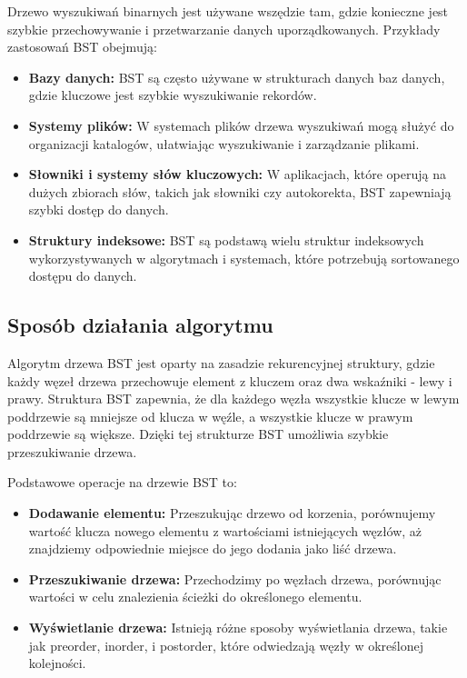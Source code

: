 Drzewo wyszukiwań binarnych jest używane wszędzie tam, gdzie konieczne jest szybkie przechowywanie i przetwarzanie danych uporządkowanych. Przykłady zastosowań BST obejmują:
\begin{itemize}
	\item \textbf{Bazy danych:} BST są często używane w strukturach danych baz danych, gdzie kluczowe jest szybkie wyszukiwanie rekordów.
	\item \textbf{Systemy plików:} W systemach plików drzewa wyszukiwań mogą służyć do organizacji katalogów, ułatwiając wyszukiwanie i zarządzanie plikami.
	\item \textbf{Słowniki i systemy słów kluczowych:} W aplikacjach, które operują na dużych zbiorach słów, takich jak słowniki czy autokorekta, BST zapewniają szybki dostęp do danych.
	\item \textbf{Struktury indeksowe:} BST są podstawą wielu struktur indeksowych wykorzystywanych w algorytmach i systemach, które potrzebują sortowanego dostępu do danych.
\end{itemize}

\subsection{Sposób działania algorytmu}

Algorytm drzewa BST jest oparty na zasadzie rekurencyjnej struktury, gdzie każdy węzeł drzewa przechowuje element z kluczem oraz dwa wskaźniki - lewy i prawy. Struktura BST zapewnia, że dla każdego węzła wszystkie klucze w lewym poddrzewie są mniejsze od klucza w węźle, a wszystkie klucze w prawym poddrzewie są większe. Dzięki tej strukturze BST umożliwia szybkie przeszukiwanie drzewa.

Podstawowe operacje na drzewie BST to:
\begin{itemize}
	\item \textbf{Dodawanie elementu:} Przeszukując drzewo od korzenia, porównujemy wartość klucza nowego elementu z wartościami istniejących węzłów, aż znajdziemy odpowiednie miejsce do jego dodania jako liść drzewa.
	\item \textbf{Przeszukiwanie drzewa:} Przechodzimy po węzłach drzewa, porównując wartości w celu znalezienia ścieżki do określonego elementu.
	\item \textbf{Wyświetlanie drzewa:} Istnieją różne sposoby wyświetlania drzewa, takie jak preorder, inorder, i postorder, które odwiedzają węzły w określonej kolejności.
\end{itemize}

